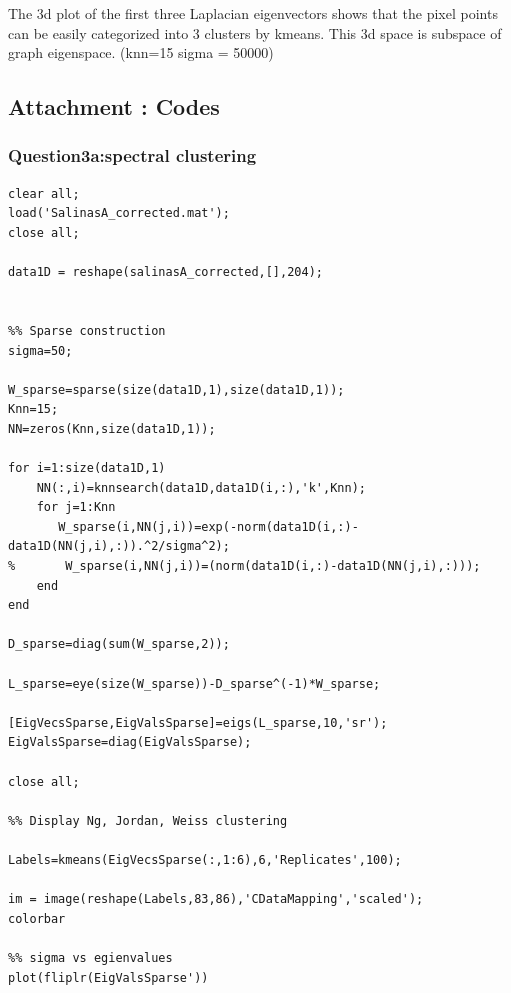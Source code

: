 \documentclass{article}
\begin{document}
The 3d plot of the first three Laplacian eigenvectors shows that the pixel points can be easily categorized into 3 clusters by kmeans. This 3d space is subspace of graph eigenspace. (knn=15 sigma = 50000)

\begin{figure}[h]
  \centering
\end{figure}

\subsection*{Attachment : Codes}
\subsubsection{Question3a:spectral clustering}
\begin{lstlisting}
clear all;
load('SalinasA_corrected.mat');
close all;

data1D = reshape(salinasA_corrected,[],204);


%% Sparse construction
sigma=50;

W_sparse=sparse(size(data1D,1),size(data1D,1));
Knn=15;
NN=zeros(Knn,size(data1D,1));

for i=1:size(data1D,1)
    NN(:,i)=knnsearch(data1D,data1D(i,:),'k',Knn);
    for j=1:Knn
       W_sparse(i,NN(j,i))=exp(-norm(data1D(i,:)-data1D(NN(j,i),:)).^2/sigma^2);
%       W_sparse(i,NN(j,i))=(norm(data1D(i,:)-data1D(NN(j,i),:)));
    end
end

D_sparse=diag(sum(W_sparse,2));

L_sparse=eye(size(W_sparse))-D_sparse^(-1)*W_sparse;

[EigVecsSparse,EigValsSparse]=eigs(L_sparse,10,'sr');
EigValsSparse=diag(EigValsSparse);

close all;

%% Display Ng, Jordan, Weiss clustering

Labels=kmeans(EigVecsSparse(:,1:6),6,'Replicates',100);

im = image(reshape(Labels,83,86),'CDataMapping','scaled');
colorbar

%% sigma vs egienvalues
plot(fliplr(EigValsSparse'))

\end{lstlisting}
\end{document}
